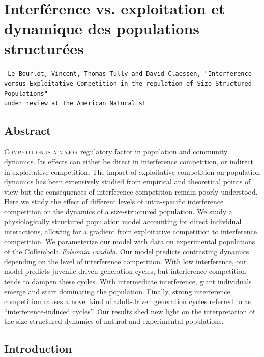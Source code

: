 \chapter[Interférence vs. exploitation et dynamique des populations
structurées][Interférence et populations structurées]{Interférence vs.
exploitation et dynamique des populations structurées}
\label{An:AmNat}

\vspace{2cm}
\begin{Spacing}{1}
\texttt{
Le Bourlot, Vincent, Thomas Tully and David Claessen, "Interference versus
Exploitative Competition in the regulation of Size-Structured Populations"\\
under review at The American Naturalist
}
\end{Spacing}


\section*{Abstract}

\lettrine[lines=3]{C}{ompetition is a major} regulatory factor in population
and community dynamics.
Its effects can either be direct in interference competition, or indirect in
exploitative competition. The impact of exploitative competition on population
dynamics has been extensively studied from empirical and theoretical points of
view but the consequences of interference competition remain poorly understood.
Here we study the effect of different levels of intra-specific interference
competition on the dynamics of a size-structured population. We study a
physiologically structured population model accounting for direct individual
interactions, allowing for a gradient from exploitative competition to
interference competition. We parameterize our model with data on experimental
populations of the Collembola \textit{Folsomia candida}. Our model predicts
contrasting dynamics depending on the level of interference competition. With low
interference, our model predicts juvenile-driven generation cycles, but
interference competition tends to dampen these cycles. With intermediate
interference, giant individuals emerge and start dominating the population.
Finally, strong interference competition causes a novel kind of adult-driven
generation cycles referred to as “interference-induced cycles”. Our results shed
new light on the interpretation of the size-structured dynamics of natural and
experimental populations.

\section{Introduction}

